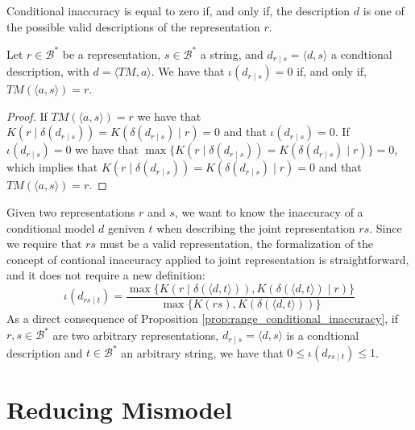 {Conditional inaccuracy is equal to zero if, and only if, the description $d$ is one of the possible valid descriptions of the representation $r$.

\begin{proposition}\label{prop:perfect_description}
Let $r \in \mathcal{B}^\ast$ be a representation, $s \in \mathcal{B}^\ast$ a string, and $d_{r \mid s} = \langle d, s \rangle$ a condtional description, with $ d = \langle TM, a \rangle$. We have that $\iota(d_{r \mid s}) = 0$ if, and only if, $TM \left(\langle a, s \rangle \right) = r$.
\end{proposition}
\begin{proof}
If $TM \left(\langle a, s \rangle \right) = r$ we have that $K \left( r \mid \delta(d_{r \mid s}) \right) = K \left( \delta(d_{r \mid s}) \mid r \right) = 0$ and that $\iota(d_{r \mid s}) = 0$. If $\iota(d_{r \mid s}) = 0$ we have that $\max\{ K \left( r \mid \delta(d_{r \mid s}) \right) = K \left( \delta(d_{r \mid s}) \mid r \right) \} = 0$, which implies that $K \left( r \mid \delta(d_{r \mid s}) \right) = K \left( \delta(d_{r \mid s}) \mid r \right) = 0$ and that $TM \left(\langle a, s \rangle \right) = r$.
\end{proof}

Given two representations $r$ and $s$, we want to know the inaccuracy of a conditional model $d$ geniven $t$ when describing the joint representation $rs$. Since we require that $rs$ must be a valid representation, the formalization of the concept of contional inaccuracy applied to joint representation is straightforward, and it does not require a new definition:
\[
\iota(d_{rs \mid t}) = \frac{ \max\{ K \left(r \mid \delta(\langle d, t \rangle) \right), K \left( \delta(\langle d, t \rangle) \mid r \right) \} } { \max\{ K(rs), K \left(\delta(\langle d, t \rangle) \right) \} }
\]
As a direct consequence of Proposition \ref{prop:range_conditional_inaccuracy}, if $r, s \in \mathcal{B}^\ast$ are two arbitrary representations, $d_{r \mid s} = \langle d, s \rangle$ is a condtional description and $t \in \mathcal{B}^\ast$ an arbitrary string, we have that $0 \leq \iota(d_{rs \mid t}) \leq 1$.

}

%
%

\section{Reducing Mismodel}

